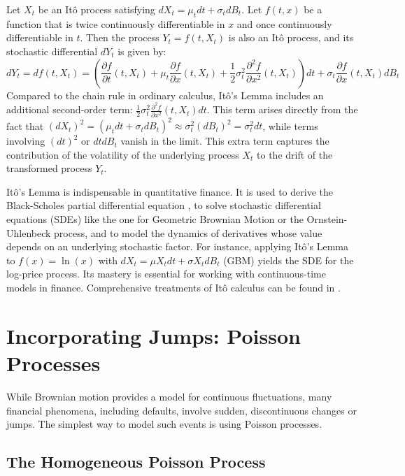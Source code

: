 \documentclass[11pt,twoside,openright]{report}
\begin{document}
Let $X_t$ be an Itô process satisfying $dX_t = \mu_t dt + \sigma_t dB_t$. Let $f(t, x)$ be a function that is twice continuously differentiable in $x$ and once continuously differentiable in $t$. Then the process $Y_t = f(t, X_t)$ is also an Itô process, and its stochastic differential $dY_t$ is given by:
\begin{equation}
dY_t = df(t, X_t) = \left( \frac{\partial f}{\partial t}(t, X_t) + \mu_t \frac{\partial f}{\partial x}(t, X_t) + \frac{1}{2} \sigma_t^2 \frac{\partial^2 f}{\partial x^2}(t, X_t) \right) dt + \sigma_t \frac{\partial f}{\partial x}(t, X_t) dB_t
\label{eq:ito_lemma}
\end{equation}
Compared to the chain rule in ordinary calculus, Itô's Lemma includes an additional second-order term: $\frac{1}{2} \sigma_t^2 \frac{\partial^2 f}{\partial x^2}(t, X_t) dt$. This term arises directly from the fact that $(dX_t)^2 = (\mu_t dt + \sigma_t dB_t)^2 \approx \sigma_t^2 (dB_t)^2 = \sigma_t^2 dt$, while terms involving $(dt)^2$ or $dt dB_t$ vanish in the limit. This extra term captures the contribution of the volatility of the underlying process $X_t$ to the drift of the transformed process $Y_t$.

Itô's Lemma is indispensable in quantitative finance. It is used to derive the Black-Scholes partial differential equation \cite{blackscholes1973pricing}, to solve stochastic differential equations (SDEs) like the one for Geometric Brownian Motion or the Ornstein-Uhlenbeck process, and to model the dynamics of derivatives whose value depends on an underlying stochastic factor. For instance, applying Itô's Lemma to $f(x) = \ln(x)$ with $dX_t = \mu X_t dt + \sigma X_t dB_t$ (GBM) yields the SDE for the log-price process. Its mastery is essential for working with continuous-time models in finance. Comprehensive treatments of Itô calculus can be found in \cite{karatzas1991brownian, revuz1999continuous}.

\section{Incorporating Jumps: Poisson Processes}
\label{sec:poisson}

While Brownian motion provides a model for continuous fluctuations, many financial phenomena, including defaults, involve sudden, discontinuous changes or jumps. The simplest way to model such events is using Poisson processes.

\subsection{The Homogeneous Poisson Process}
\label{subsec:homo_poisson}
\end{document}
